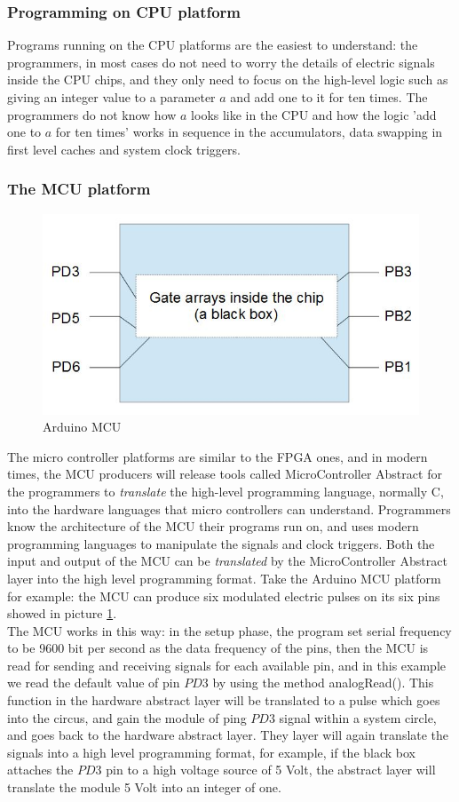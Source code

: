 \documentclass[11pt,openright,a4paper]{report}
\begin{document}
\subsubsection{Programming on CPU platform}
Programs running on the CPU platforms are the easiest to understand: the programmers, in most cases do not need to worry the details of electric signals inside the CPU chips, and they only need to focus on the high-level logic such as giving an integer value to a parameter $a$ and add one to it for ten times. The programmers do not know how $a$ looks like in the CPU and how the logic 'add one to $a$ for ten times' works in sequence in the accumulators, data swapping in first level caches and system clock triggers. \\
\subsubsection{The MCU platform}
\begin{figure}
\centering
\includegraphics[width=0.6\linewidth]{picture/mcu}
\caption{Arduino MCU}
\label{fig:mcu}
\end{figure}
The micro controller platforms are similar to the FPGA ones, and in modern times, the MCU producers will release tools called MicroController Abstract for the programmers to \textit{translate} the high-level programming language, normally C, into the hardware languages that micro controllers can understand. Programmers know the architecture of the MCU their programs run on, and uses modern programming languages to manipulate the signals and clock triggers. Both the input and output of the MCU can be \textit{translated} by the MicroController Abstract layer into the high level programming format. Take the Arduino MCU platform for example: the MCU can produce six modulated electric pulses on its six pins showed in picture \ref{fig:mcu}.\\
The MCU works in this way: in the setup phase, the program set serial frequency to be 9600 bit per second as the data frequency of the pins, then the MCU is read for sending and receiving signals for each available pin, and in this example we read the default value of pin $PD3$ by using the method analogRead(). This function in the hardware abstract layer will be translated to a pulse which goes into the circus, and gain the module of ping $PD3$ signal within a system circle, and goes back to the hardware abstract layer. They layer will again translate the signals into a high level programming format, for example, if the black box attaches the $PD3$ pin to a high voltage source of 5 Volt, the abstract layer will translate the module 5 Volt into an integer of one.\\
\end{document}
